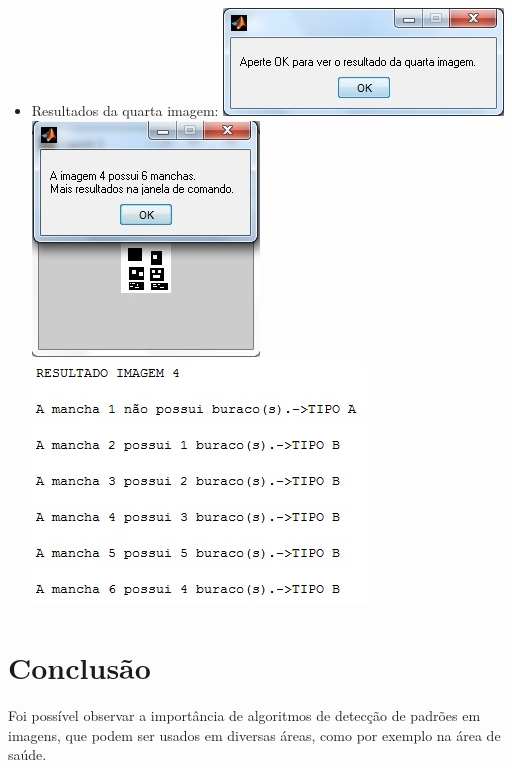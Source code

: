 \documentclass[conference]{IEEEtran}
\begin{document}
\begin{itemize}
	\item Resultados da quarta imagem:
		\vspace{2\baselineskip}\vspace{-\parskip}
		\includegraphics[scale=0.95]{images/janela4}
		\vspace{2\baselineskip}\vspace{-\parskip}
		\includegraphics[scale=1.0]{images/janela4-2}
		\includegraphics[scale=0.8]{images/comando4}
		\vspace{2\baselineskip}\vspace{-\parskip}

 \end{itemize}

\section{Conclus\~ao} 
\label{sec:meth} 

Foi poss\'ivel observar a import\^ancia de algoritmos de detec\c{c}\~ao de padr\~oes em imagens, que podem ser usados em diversas \'areas, como por exemplo na \'area de sa\'ude.
\end{document}
